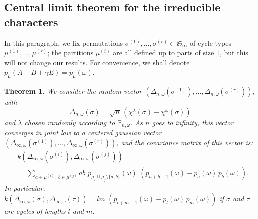\documentclass[smallextended,nospthms]{svjour3}
\newtheorem{theorem}{Theorem}
\theoremstyle{remark}
\newcommand{\sym}{\mathfrak{S}}
\newcommand{\proba}{\mathbb{P}}
\begin{document}
\subsection{Central limit theorem for the irreducible characters} In this paragraph, we fix permutations $\sigma^{(1)},\ldots,\sigma^{(r)} \in \sym_{\infty}$ of cycle types $\mu^{(1)},\ldots,\mu^{(r)}$; the partitions $\mu^{(i)}$ are all defined up to parts of size $1$, but this will not change our results. For convenience, we shall denote $p_{\mu}(A-B+\gamma E)=p_{\mu}(\omega)$.
\begin{theorem}\label{mainalg}
We consider the random vector $(\Delta_{n,\omega}(\sigma^{(1)}),\ldots,\Delta_{n,\omega}(\sigma^{(r)}))$, with
$$\Delta_{n,\omega}(\sigma)=\sqrt{n}\,\left(\chi^{\lambda}(\sigma)-\chi^{\omega}(\sigma)\right)$$
and $\lambda$ chosen randomly according to $\proba_{n,\omega}$. As $n$ goes to infinity, this vector converges in joint law to a centered gaussian vector $(\Delta_{\infty,\omega}(\sigma^{(1)}),\ldots,\Delta_{\infty,\omega}(\sigma^{(r)}))$, and the covariance matrix of this vector is:
\begin{align*}
&k(\Delta_{\infty,\omega}(\sigma^{(i)}),\Delta_{\infty,\omega}(\sigma^{(j)}))\\
&=\sum_{a \in \mu^{(i)},\,\,
b\in \mu^{(j)} } ab\,\,p_{\mu_{i}\sqcup \mu_{j}\setminus \{a,b\}}(\omega)\,\,(p_{a+b-1}(\omega)-p_{a}(\omega)\,p_{b}(\omega)).
\end{align*}
In particular, $k(\Delta_{\infty,\omega}(\sigma),\Delta_{\infty,\omega}(\tau))=lm\,\,(p_{l+m-1}(\omega)-p_{l}(\omega)\,p_{m}(\omega))$ if $\sigma$ and $\tau$ are cycles of lengths $l$ and $m$.
\end{theorem}
\end{document}
